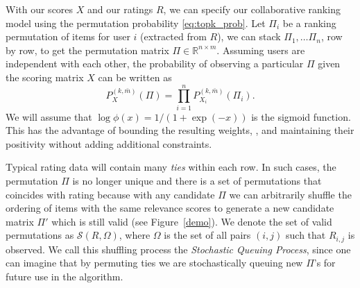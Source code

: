 \documentclass{article}
\def\R{\mathbb{R}}
\def\R{\mathbb{R}}
\begin{document}

With our scores $X$ and our ratings $R$, we can specify our collaborative ranking model using the permutation probability \eqref{eq:topk_prob}.
Let $\Pi_i$ be a ranking permutation of items for user $i$ (extracted from $R$), we can stack $\Pi_1, \dots \Pi_n$, row by row, to get the permutation matrix $\Pi \in \R^{n\times m}$. 
Assuming users are independent with each other, the probability of observing a particular $\Pi$ given the scoring matrix $X$
can be written as
\begin{equation}
    P_{X}^{(k, \bar{m})}(\Pi) = \prod_{i=1}^{n} P^{(k,\bar{m})}_{X_i}(\Pi_i).
\end{equation}
 We will assume that $\log \phi(x) = 1/(1 + \exp(-x))$ is the sigmoid function.
This has the advantage of bounding the resulting weights, , and maintaining their positivity without adding additional constraints.

Typical rating data will contain many {\em ties} within each row.
In such cases, the permutation $\Pi$ is no longer unique and there is a set of permutations
that coincides with rating because with any candidate $\Pi$ we can arbitrarily shuffle the ordering
of items with the same relevance scores to generate a new candidate matrix $\Pi'$ which is still valid (see Figure~\ref{demo}). We denote the set of valid permutations as  $\mathcal S (R, \Omega)$, where $\Omega$ is the set of all pairs $(i,j)$ such that $R_{i,j}$ is observed.
We call this shuffling process the {\it Stochastic Queuing Process}, since one can imagine that by permuting ties we are stochastically queuing new $\Pi$'s for future use in the algorithm.
\end{document}
